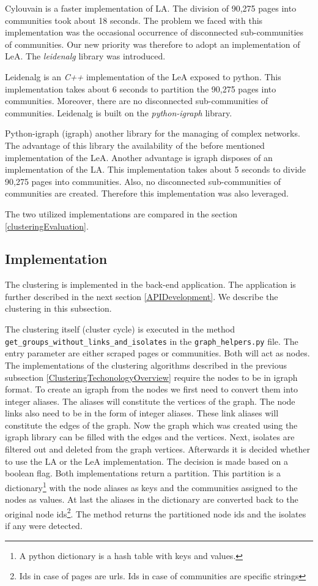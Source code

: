 Cylouvain is a faster implementation of LA. The division of 90,275 pages into communities took about 18 seconds. The problem we faced with this implementation was the occasional occurrence of disconnected sub-communities of communities. Our new priority was therefore to adopt an implementation of LeA. The \textit{leidenalg} \cite{leidenalg} library was introduced.

Leidenalg is an \textit{C++} implementation of the LeA exposed to python. This implementation takes about 6 seconds to partition the 90,275 pages into communities. Moreover, there are no disconnected sub-communities of communities. Leidenalg is built on the \textit{python-igraph} library. 

Python-igraph (igraph) another library for the managing of complex networks. The advantage of this library the availability of the before mentioned implementation of the LeA. Another advantage is igraph disposes of an implementation of the LA. This implementation takes about 5 seconds to divide 90,275 pages into communities. Also, no disconnected sub-communities of communities are created. Therefore this implementation was also leveraged.

The two utilized implementations are compared in the section \ref{clusteringEvaluation}.

\subsection{Implementation} \label{ClusteringImplementation}
The clustering is implemented in the back-end application. The application is further described in the next section \ref{APIDevelopment}. We describe the clustering in this subsection. 

The clustering itself (cluster cycle) is executed in the method \\ \texttt{get\_groups\_without\_links\_and\_isolates} in the \texttt{graph\_helpers.py} file. The entry parameter are either scraped pages or communities. Both will act as nodes. The implementations of the clustering algorithms described in the previous subsection \ref{ClusteringTechonologyOverview} require the nodes to be in igraph format. To create an igraph from the nodes we first need to convert them into integer aliases. The aliases will constitute the vertices of the graph. The node links also need to be in the form of integer aliases. These link aliases will constitute the edges of the graph. Now the graph which was created using the igraph library can be filled with the edges and the vertices. Next, isolates are filtered out and deleted from the graph vertices. Afterwards it is decided whether to use the LA or the LeA implementation. The decision is made based on a boolean flag. Both implementations return a partition. This partition is a dictionary\footnote{A python dictionary is a hash table with keys and values.} with the node aliases as keys and the communities assigned to the nodes as values. At last the aliases in the dictionary are converted back to the original node ids\footnote{Ids in case of pages are urls. Ids in case of communities are specific strings}. The method returns the partitioned node ids and the isolates if any were detected. 

